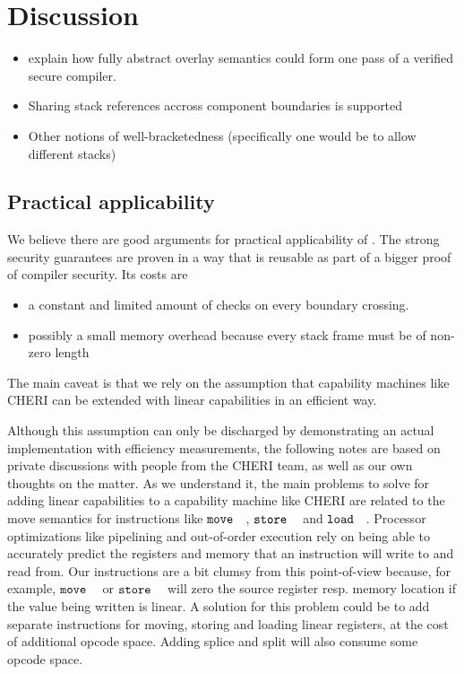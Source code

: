 \documentclass[acmsmall,review,anonymous]{acmart}\settopmatter{printfolios=true,printccs=false,printacmref=false}
\begin{document}
\section{Discussion}
\label{sec:discussion}
\begin{itemize}
\item explain how fully abstract overlay semantics could form one pass of a verified secure compiler.
\item Sharing stack references accross component boundaries is supported
\item Other notions of well-bracketedness (specifically one would be to allow different stacks)
\end{itemize}

\subsection{Practical applicability}
We believe there are good arguments for practical applicability of \stktokens{}.
The strong security guarantees are proven in a way that is reusable as part of a bigger proof of compiler security.
Its costs are
\begin{itemize}
\item a constant and limited amount of checks on every boundary crossing.
\item possibly a small memory overhead because every stack frame must be of non-zero length
\end{itemize}
The main caveat is that we rely on the assumption that capability machines like CHERI can be extended with linear capabilities in an efficient way.

Although this assumption can only be discharged by demonstrating an actual implementation with efficiency measurements, the following notes are based on private discussions with people from the CHERI team, as well as our own thoughts on the matter.
As we understand it, the main problems to solve for adding linear capabilities to a capability machine like CHERI are related to the move semantics for instructions like $\tmove{}$, $\tstore{}$ and $\tload{}$.
Processor optimizations like pipelining and out-of-order execution rely on being able to accurately predict the registers and memory that an instruction will write to and read from.
Our instructions are a bit clumsy from this point-of-view because, for example, $\tmove{}$ or $\tstore{}$ will zero the source register resp. memory location if the value being written is linear.
A solution for this problem could be to add separate instructions for moving, storing and loading linear registers, at the cost of additional opcode space.
Adding splice and split will also consume some opcode space.
\end{document}

